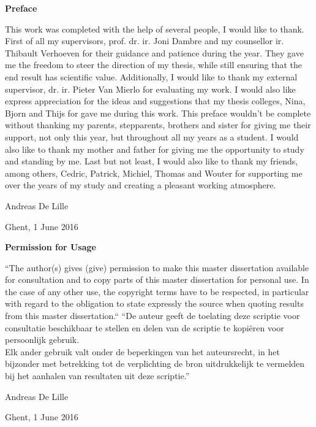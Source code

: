\newpage

\noindent \textbf{\huge Preface}

\vspace{1.5cm}

\noindent

This work was completed with the help of several people, I would like to thank. First of all my supervisors, prof. dr. ir. Joni Dambre and my counsellor ir. Thibault Verhoeven for their guidance and patience during the year. They gave me the freedom to steer the direction of my thesis, while still ensuring that the end result has scientific value. Additionally, I would like to thank my external supervisor, dr. ir. Pieter Van Mierlo for evaluating my work. I would also like express appreciation for the ideas and suggestions that my thesis colleges, Nina, Bjorn and Thijs for gave me during this work.
\npar
This preface wouldn't be complete without thanking my parents, stepparents, brothers and sister for giving me their support, not only this year, but throughout all my years as a student. I would also like to thank my mother and father for giving me the opportunity to study and standing by me.
\npar
Last but not least, I would also like to thank my friends, among others, Cedric, Patrick, Michiel, Thomas and Wouter for supporting me over the years of my study and creating a pleasant working atmosphere. 

\addvspace{3cm}

\hfill \noindent Andreas De Lille

\hfill \noindent Ghent, 1 June 2016

\clearpage

\noindent \textbf{\huge Permission for Usage}
\vspace{1.5cm}

\noindent
``The author(s) gives (give) permission to make this master dissertation available for consultation
and to copy parts of this master dissertation for personal use.
 In the case of any other use, the copyright terms have to be respected, in particular with regard to
the obligation to state expressly the source when quoting results from this master dissertation.``
\npar
``De auteur geeft de toelating deze scriptie voor consultatie beschikbaar
te stellen en delen van de scriptie te kopi\"eren voor persoonlijk
gebruik.\\
Elk ander gebruik valt onder de beperkingen van het auteursrecht,
in het bijzonder met betrekking tot de verplichting de bron uitdrukkelijk
te vermelden bij het aanhalen van resultaten uit deze scriptie.''

\addvspace{4cm}

\hfill \noindent Andreas De Lille

\hfill \noindent Ghent, 1 June 2016

